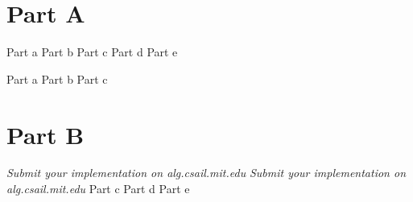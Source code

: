 \documentclass[12pt,twoside]{article}
\begin{document}

\begin{problems}

\section*{Part A}

\problem  %

\begin{problemparts}
\problempart Part a  %
\problempart Part b  %
\problempart Part c  %
\problempart Part d  %
\problempart Part e  %
\end{problemparts}

\problem  %

\begin{problemparts}
\problempart Part a %
\problempart Part b %
\problempart Part c %
\end{problemparts}

\section*{Part B}

\problem
\begin{problemparts}
\problempart \emph{Submit your implementation on alg.csail.mit.edu}
\problempart \emph{Submit your implementation on alg.csail.mit.edu}
\problempart Part c %
\problempart Part d %
\problempart Part e %
\end{problemparts}

\end{problems}
\end{document}
